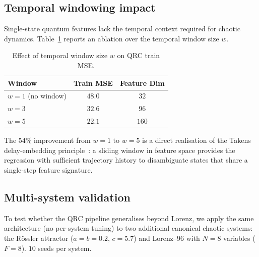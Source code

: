 \documentclass[11pt,a4paper]{article}
\begin{document}
\subsection{Temporal windowing impact}
\label{ssec:windowing}

Single-state quantum features lack the temporal context required for
chaotic dynamics. Table~\ref{tab:ablation} reports an ablation over
the temporal window size $w$.

\begin{table}[h]
    \centering
    \caption{Effect of temporal window size $w$ on QRC train MSE.}
    \label{tab:ablation}
    \begin{tabular}{lcc}
        \toprule
        \textbf{Window} & \textbf{Train MSE} & \textbf{Feature Dim} \\
        \midrule
        $w=1$ (no window) & $48.0$ & $32$ \\
        $w=3$             & $32.6$ & $96$ \\
        $w=5$             & $\mathbf{22.1}$ & $160$ \\
        \bottomrule
    \end{tabular}
\end{table}

The $54\%$ improvement from $w=1$ to $w=5$ is a direct realisation of
the Takens delay-embedding principle~\cite{takens1981}: a sliding
window in feature space provides the regression with sufficient
trajectory history to disambiguate states that share a single-step
feature signature.

\subsection{Multi-system validation}
\label{ssec:multisystem}

To test whether the QRC pipeline generalises beyond Lorenz, we apply
the same architecture (no per-system tuning) to two additional
canonical chaotic systems: the R\"{o}ssler attractor ($a=b=0.2$,
$c=5.7$) and Lorenz--96 with $N=8$ variables ($F=8$). $10$ seeds per
system.
\end{document}
